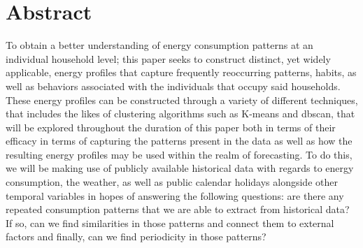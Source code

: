 \clearpage
{}
{}

\begingroup
\let\clearpage\relax
\let\cleardoublepage\relax
\let\cleardoublepage\relax

\chapter*{Abstract}
To obtain a better understanding of energy consumption patterns at an individual household level; this paper seeks to construct distinct, yet widely applicable, energy profiles that capture frequently reoccurring patterns, habits, as well as behaviors associated with the individuals that occupy said households. These energy profiles can be constructed through a variety of different techniques, that includes the likes of clustering algorithms such as K-means and \gls{dbscan}, that will be explored throughout the duration of this paper both in terms of their efficacy in terms of capturing the patterns present in the data as well as how the resulting energy profiles may be used within the realm of forecasting. To do this, we will be making use of publicly available historical data with regards to energy consumption, the weather, as well as public calendar holidays alongside other temporal variables in hopes of answering the following questions: are there any repeated consumption patterns that we are able to extract from historical data? If so, can we find similarities in those patterns and connect them to external factors and finally, can we find periodicity in those patterns?

\vfill

\endgroup

\vfill